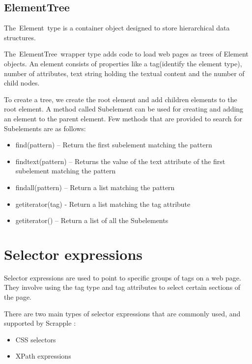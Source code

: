 \documentclass[letterpaper,12pt,english]{sphinxmanual}
\begin{document}
\subsection{ElementTree}
\label{concepts/structure:elementtree}
The Element type is a container object designed to store hierarchical data structures.

The ElementTree wrapper type adds code to load web pages as trees of Element objects.
An element consists of properties like a tag(identify the element type), number of attributes, text string holding the textual content and the number of child nodes.

To create a tree, we create the root element and add children elements to the root element. A method called Subelement can be used for creating and adding an element to the parent element.
Few methods that are provided to search for Subelements are as follows:
\begin{itemize}
\item {} 
find(pattern) – Return the first subelement matching the pattern

\item {} 
findtext(pattern) – Returns the value of the text attribute of the first subelement matching the pattern

\item {} 
findall(pattern) – Return a list matching the pattern

\item {} 
getiterator(tag) - Return a list matching the tag attribute

\item {} 
getiterator() – Return a list of all the Subelements

\end{itemize}


\section{Selector expressions}
\label{concepts/selectors:concepts-selectors}\label{concepts/selectors::doc}\label{concepts/selectors:selector-expressions}
Selector expressions are used to point to specific groups of tags on a web page. They involve using the tag type and tag attributes to select certain sections of the page.

There are two main types of selector expressions that are commonly used, and supported by Scrapple :
\begin{itemize}
\item {} 
CSS selectors

\item {} 
XPath expressions

\end{itemize}
\end{document}
